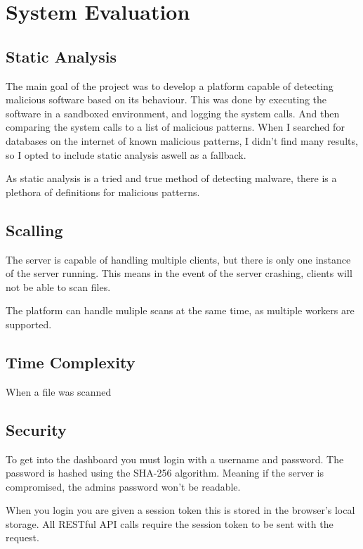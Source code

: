 \chapter{System Evaluation}

\section{Static Analysis}
The main goal of the project was to develop a platform capable of detecting malicious software based on its behaviour.
This was done by executing the software in a sandboxed environment, and logging the system calls.
And then comparing the system calls to a list of malicious patterns.
When I searched for databases on the internet of known malicious patterns,
I didn't find many results, so I opted to include static analysis aswell as a fallback.

As static analysis is a tried and true method of detecting malware,
there is a plethora of definitions for malicious patterns.

\section{Scalling}
The server is capable of handling multiple clients, but there is only one instance of the server running.
This means in the event of the server crashing, clients will not be able to scan files.

The platform can handle muliple scans at the same time, as multiple workers are supported.

\section{Time Complexity}
When a file was scanned 

\section{Security}
To get into the dashboard you must login with a username and password.
The password is hashed using the SHA-256 algorithm.
Meaning if the server is compromised, the admins password won't be readable.

When you login you are given a session token this is stored in the browser's local storage.
All RESTful API calls require the session token to be sent with the request.

